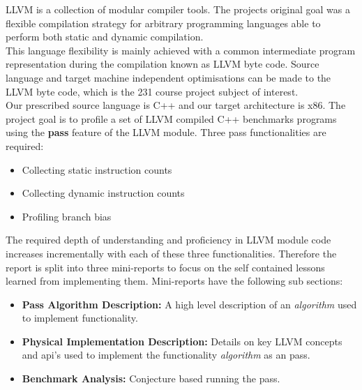 LLVM is a collection of modular compiler tools. The projects original goal was a flexible compilation strategy for arbitrary programming languages able to perform both static and dynamic compilation.\\
This language flexibility is mainly achieved with a common intermediate program representation during the compilation known as LLVM byte code. Source language and target machine independent optimisations can be made to the LLVM byte code, which is the 231 course project subject of interest.\\
Our prescribed source language is C++ and our target architecture is x86. The project goal is to profile a set of LLVM compiled C++ benchmarks programs using the \textbf{pass} feature of the  LLVM module.
Three pass functionalities are required:
\begin{itemize}
\item{Collecting static instruction counts}
\item{Collecting dynamic instruction counts}
\item{Profiling branch bias }
\end{itemize}
The required depth of understanding and proficiency in LLVM module code increases incrementally with each of these three functionalities. Therefore the report is split into three mini-reports to focus on the self contained lessons learned from implementing them. Mini-reports have the following sub sections:\\
\begin{itemize}
\item{\textbf{Pass Algorithm Description: }A high level description of an \textit{algorithm} used to implement functionality.}
\item{\textbf{Physical Implementation Description: }Details on key LLVM concepts and api's used to implement the functionality \textit{algorithm} as an  pass.}
\item{\textbf{Benchmark Analysis: }Conjecture based running the  pass.}
\end{itemize}
